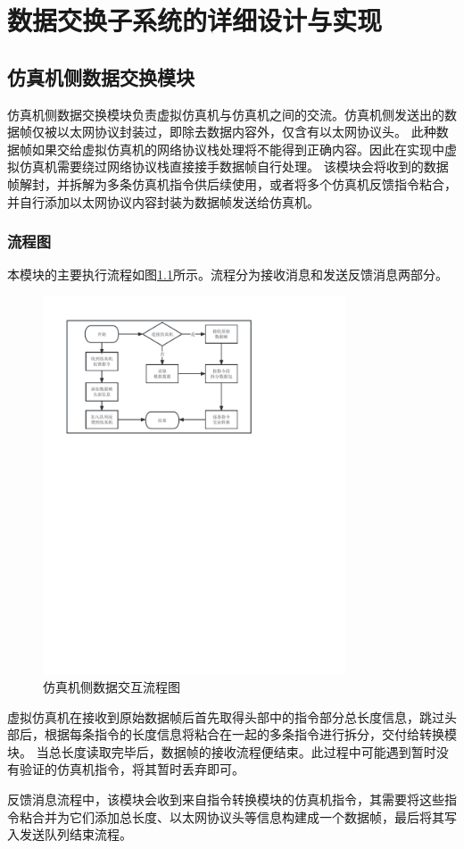 \chapter{数据交换子系统的详细设计与实现}
\section{仿真机侧数据交换模块}
仿真机侧数据交换模块负责虚拟仿真机与仿真机之间的交流。仿真机侧发送出的数据帧仅被以太网协议封装过，即除去数据内容外，仅含有以太网协议头。
此种数据帧如果交给虚拟仿真机的网络协议栈处理将不能得到正确内容。因此在实现中虚拟仿真机需要绕过网络协议栈直接接手数据帧自行处理。
该模块会将收到的数据帧解封，并拆解为多条仿真机指令供后续使用，或者将多个仿真机反馈指令粘合，并自行添加以太网协议内容封装为数据帧发送给仿真机。
\subsection{流程图}
本模块的主要执行流程如图\ref{module11}所示。流程分为接收消息和发送反馈消息两部分。
\begin{figure}[h!]
    \begin{center}
        \includegraphics[width=0.8\textwidth]{pictures/flowchart1.pdf}
        \caption{仿真机侧数据交互流程图}
        \label{module11}
    \end{center}
\end{figure}
\vspace{7pt}
\par
虚拟仿真机在接收到原始数据帧后首先取得头部中的指令部分总长度信息，跳过头部后，根据每条指令的长度信息将粘合在一起的多条指令进行拆分，交付给转换模块。
当总长度读取完毕后，数据帧的接收流程便结束。此过程中可能遇到暂时没有验证的仿真机指令，将其暂时丢弃即可。
\par
反馈消息流程中，该模块会收到来自指令转换模块的仿真机指令，其需要将这些指令粘合并为它们添加总长度、以太网协议头等信息构建成一个数据帧，最后将其写入发送队列结束流程。

